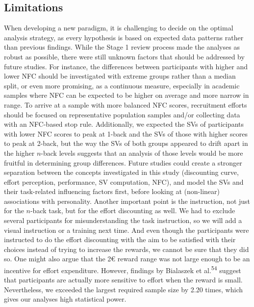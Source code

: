 \documentclass[
  man,floatsintext]{apa6}
\begin{document}
\hypertarget{limitations}{%
\subsection{Limitations}\label{limitations}}

When developing a new paradigm, it is challenging to decide on the optimal analysis strategy, as every hypothesis is based on expected data patterns rather than previous findings.
While the Stage 1 review process made the analyses as robust as possible, there were still unknown factors that should be addressed by future studies.
For instance, the differences between participants with higher and lower NFC should be investigated with extreme groups rather than a median split, or even more promising, as a continuous measure, especially in academic samples where NFC can be expected to be higher on average and more narrow in range.
To arrive at a sample with more balanced NFC scores, recruitment efforts should be focused on representative population samples and/or collecting data with an NFC-based stop rule.
Additionally, we expected the SVs of participants with lower NFC scores to peak at 1-back and the SVs of those with higher scores to peak at 2-back, but the way the SVs of both groups appeared to drift apart in the higher \(n\)-back levels suggests that an analysis of those levels would be more fruitful in determining group differences.
Future studies could create a stronger separation between the concepts investigated in this study (discounting curve, effort perception, performance, SV computation, NFC), and model the SVs and their task-related influencing factors first, before looking at (non-linear) associations with personality.
Another important point is the instruction, not just for the \(n\)-back task, but for the effort discounting as well.
We had to exclude several participants for misunderstanding the task instruction, so we will add a visual instruction or a training next time.
And even though the participants were instructed to do the effort discounting with the aim to be satisfied with their choices instead of trying to increase the rewards, we cannot be sure that they did so.
One might also argue that the 2€ reward range was not large enough to be an incentive for effort expenditure.
However, findings by Bialaszek et al.\textsuperscript{54} suggest that participants are actually more sensitive to effort when the reward is small.
Nevertheless, we exceeded the largest required sample size by 2.20 times, which gives our analyses high statistical power.
\end{document}
